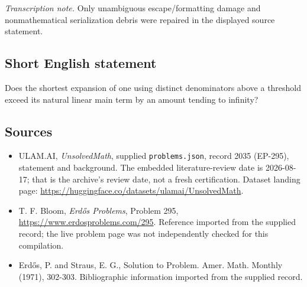 \documentclass[11pt,a4paper]{article}
\begin{document}
{\small\emph{Transcription note.} Only unambiguous escape/formatting damage and nonmathematical serialization debris were repaired in the displayed source statement.}

\subsection{Short English statement}

Does the shortest expansion of one using distinct denominators above a threshold exceed its natural linear main term by an amount tending to infinity?

\subsection{Sources}

{\small

\begin{itemize}

\item[\hypertarget{source:2035:1}{S1}] ULAM.AI, \emph{UnsolvedMath}, supplied \texttt{problems.json}, record 2035 (EP-295), statement and background. The embedded literature-review date is 2026-08-17; that is the archive’s review date, not a fresh certification. Dataset landing page: \url{https://huggingface.co/datasets/ulamai/UnsolvedMath}.

\item[\hypertarget{source:2035:2}{S2}] T. F. Bloom, \emph{Erdős Problems}, Problem 295, \url{https://www.erdosproblems.com/295}. Reference imported from the supplied record; the live problem page was not independently checked for this compilation.

\item[\hypertarget{source:2035:3}{S3}] Erd\H{o}s, P. and Straus, E. G., Solution to Problem. Amer. Math. Monthly (1971), 302-303. Bibliographic information imported from the supplied record.

\end{itemize}

}

\label{end:2035}
\end{document}

